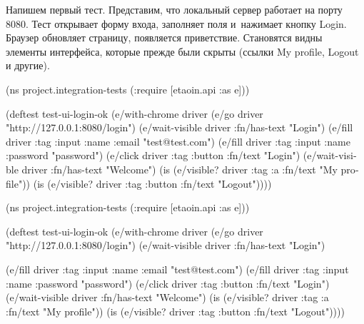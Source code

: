 
Напишем первый тест. Представим, что локальный сервер работает на порту
8080. Тест открывает форму входа, заполняет поля и~нажимает кнопку
Login. Браузер обновляет страницу, появляется приветствие. Становятся видны
элементы интерфейса, которые прежде были скрыты (ссылки My profile, Logout и
другие).

\ifnarrow

\begin{english}
  \begin{clojure}
(ns project.integration-tests
  (:require [etaoin.api :as e]))

(deftest test-ui-login-ok
  (e/with-chrome {} driver
    (e/go driver
      "http://127.0.0.1:8080/login")
    (e/wait-visible driver
      {:fn/has-text "Login"})
    (e/fill driver
      {:tag :input :name :email}
      "test@test.com")
    (e/fill driver
      {:tag :input :name :password}
      "password")
    (e/click driver
      {:tag :button :fn/text "Login"})
    (e/wait-visible driver
      {:fn/has-text "Welcome"})
    (is (e/visible? driver
          {:tag :a
           :fn/text "My profile"}))
    (is (e/visible? driver
          {:tag :button
           :fn/text "Logout"}))))
  \end{clojure}
\end{english}

\else

\ifafive

\begin{english}
  \begin{clojure}
(ns project.integration-tests
  (:require [etaoin.api :as e]))

(deftest test-ui-login-ok
  (e/with-chrome {} driver
    (e/go driver "http://127.0.0.1:8080/login")
    (e/wait-visible driver {:fn/has-text "Login"})
  \end{clojure}
\end{english}

\pagebreakafive

\begin{english}
  \begin{clojure}
    (e/fill driver
       {:tag :input :name :email} "test@test.com")
    (e/fill driver
       {:tag :input :name :password} "password")
    (e/click driver {:tag :button :fn/text "Login"})
    (e/wait-visible driver {:fn/has-text "Welcome"})
    (is (e/visible? driver
           {:tag :a :fn/text "My profile"}))
    (is (e/visible? driver
           {:tag :button :fn/text "Logout"}))))
  \end{clojure}
\end{english}

